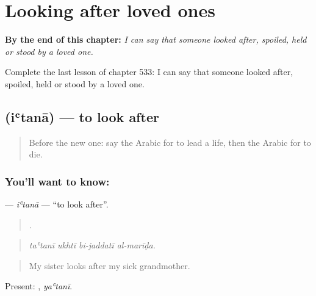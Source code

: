 
\chapter{Looking after loved ones}
\label{ch:ar-looking-after-loved-ones}

\begin{chapteropening}
\textbf{By the end of this chapter:} \emph{I can say that someone looked after, spoiled, held or stood by a loved one.}

Complete the last lesson of chapter 533: I can say that someone looked after, spoiled, held or stood by a loved one.
\end{chapteropening}

\section[\texorpdfstring{\ar{اعتنى} (iʿtanā)}{اعتنى (iʿtanā)}]{ (iʿtanā) — to look after}

\label{lesson:AR-C533-itana}



\begin{quote}
Before the new one: say the Arabic for to lead a life, then the Arabic for to die.
\end{quote}

\subsection*{You'll want to know: }
\textbf{} — \emph{iʿtanā} — \textquotedblleft{}to look after\textquotedblright{}.

\begin{quote}
   .
\end{quote}

\begin{quote}
\emph{taʿtanī ukhtī bi-jaddatī al-marīḍa.}
\end{quote}

\begin{quote}
My sister looks after my sick grandmother.
\end{quote}

Present: , \emph{yaʿtanī}.

